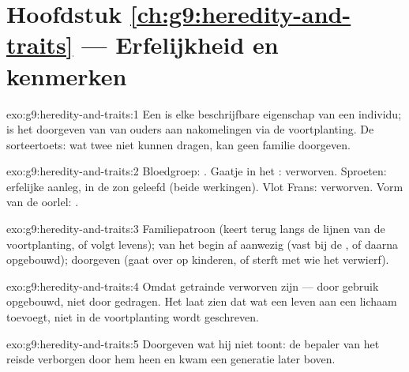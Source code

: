 \section*{Hoofdstuk \ref{ch:g9:heredity-and-traits} --- Erfelijkheid en kenmerken}

\begin{solution}{exo:g9:heredity-and-traits:1}
Een  is elke beschrijfbare eigenschap van een individu;
 is het doorgeven van  van ouders aan
nakomelingen via de voortplanting. De sorteertoets: wat twee
 niet kunnen dragen, kan geen familie doorgeven.
\end{solution}

\begin{solution}{exo:g9:heredity-and-traits:2}
Bloedgroep: . Gaatje in het : verworven. Sproeten:
erfelijke aanleg, in de zon geleefd (beide werkingen). Vlot
Frans: verworven. Vorm van de oorlel: .
\end{solution}

\begin{solution}{exo:g9:heredity-and-traits:3}
Familiepatroon (keert terug langs de lijnen van de
voortplanting, of volgt levens); van het begin af aanwezig
(vast bij de , of daarna opgebouwd); doorgeven
(gaat over op kinderen, of sterft met wie het verwierf).
\end{solution}

\begin{solution}{exo:g9:heredity-and-traits:4}
Omdat getrainde  verworven zijn --- door gebruik
opgebouwd, niet door  gedragen. Het laat zien
dat wat een leven aan een lichaam toevoegt, niet in de
voortplanting wordt geschreven.
\end{solution}

\begin{solution}{exo:g9:heredity-and-traits:5}
Doorgeven wat hij niet toont: de bepaler van het 
reisde verborgen door hem heen en kwam een generatie later
boven.
\end{solution}

